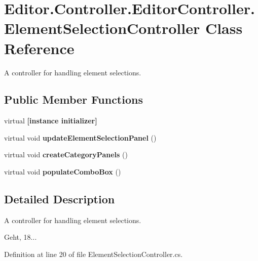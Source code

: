 \section{Editor.\-Controller.\-Editor\-Controller.\-Element\-Selection\-Controller Class Reference}
\label{class_editor_1_1_controller_1_1_editor_controller_1_1_element_selection_controller}


A controller for handling element selections.  


\subsection*{Public Member Functions}
\begin{DoxyCompactItemize}
\item 
virtual {\bfseries [instance initializer]}\label{class_editor_1_1_controller_1_1_editor_controller_1_1_element_selection_controller_afe28842352c26aa053f1fe990bdf4d1e}

\item 
virtual void {\bfseries update\-Element\-Selection\-Panel} ()\label{class_editor_1_1_controller_1_1_editor_controller_1_1_element_selection_controller_a98414d49779be7518b3ca05ed0c70d5b}

\item 
virtual void {\bfseries create\-Category\-Panels} ()\label{class_editor_1_1_controller_1_1_editor_controller_1_1_element_selection_controller_ac9dab5bd64e8a76ac6d698b91ca08f8a}

\item 
virtual void {\bfseries populate\-Combo\-Box} ()\label{class_editor_1_1_controller_1_1_editor_controller_1_1_element_selection_controller_a93b2c408b70d1981fc94a91257b34465}

\end{DoxyCompactItemize}


\subsection{Detailed Description}
A controller for handling element selections. 

Geht, 18... 

Definition at line 20 of file Element\-Selection\-Controller.\-cs.

